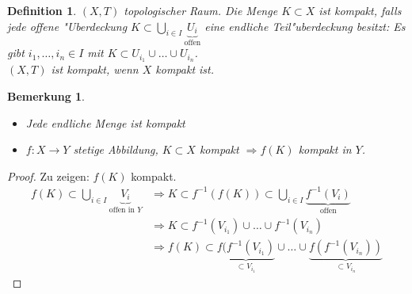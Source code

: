 \documentclass[a4paper,12pt,numbers=noenddot,parskip=full]{scrartcl}
\theoremstyle{dotless}
\newtheorem{definition}[theorem]{Definition}
\newtheorem{remark}[theorem]{Bemerkung}
\begin{document}
\begin{definition}
	$(X,T)$ topologischer Raum. Die Menge $K \subset X$ ist kompakt, falls jede offene "Uberdeckung $K \subset \bigcup\limits_{i \in I} \underbrace{U_i}_{\text{offen}}$ eine endliche Teil"uberdeckung besitzt: Es gibt $i_1, \dots, i_n \in I$ mit $K \subset U_{i_1} \cup \dots \cup U_{i_n}$.\\
	$(X,T)$ ist kompakt, wenn $X$ kompakt ist.
\end{definition}
\begin{remark}
	\begin{itemize}
		\item Jede endliche Menge ist kompakt
		\item $f: X \longrightarrow Y$ stetige Abbildung, $K \subset X$ kompakt $\Rightarrow f(K)$ kompakt in $Y$.
	\end{itemize}
\end{remark}
\begin{proof}
	Zu zeigen: $f(K)$ kompakt.
	\begin{align*}
		f(K) \subset \bigcup\limits_{i \in I} \underbrace{V_i}_{\text{offen in }Y} &\Rightarrow K \subset f^{-1}(f(K)) \subset \bigcup\limits_{i \in I} \underbrace{f^{-1}(V_i)}_{\text{offen}}\\
		&\Rightarrow K \subset f^{-1}(V_{i_1}) \cup \dots \cup f^{-1}(V_{i_n})\\
		&\Rightarrow f(K) \subset \underbrace{f(f^{-1}(V_{i_1})}_{\subset V_{i_1}} \cup \dots \cup \underbrace{f(f^{-1}(V_{i_n}))}_{\subset V_{i_n}} 
	\end{align*}
\end{proof}
\end{document}
